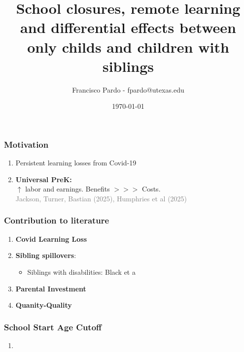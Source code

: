 \documentclass{beamer}
\title[]{School closures, remote learning and differential effects between only childs and children with siblings}
\author[Francisco Pardo] %
{Francisco Pardo - fpardo@utexas.edu \inst{1}}
\institute[UT] %
{
  \inst{1}%
  University of Texas at Austin
}
\date{\today}
\begin{document}
\frame{\titlepage}


\begin{frame}
    \label{update_scott}
    \frametitle{Motivation}
    \begin{enumerate}
        \item Persistent learning losses from Covid-19
        \item \textbf{Universal PreK:} \\
        $\uparrow$ labor and earnings. Benefits $>>>$ Costs. \\
        \small \textcolor{grey}{Jackson, Turner, Bastian (2025), Humphries et al (2025)}
    \end{enumerate}
\end{frame}

\begin{frame}
    \label{update_scott}
    \frametitle{Contribution to literature}
    \begin{enumerate}
        \item \textbf{Covid Learning Loss} \\
        \item \textbf{Sibling spillovers}: 
        \begin{itemize}
            \item Siblings with disabilities: Black et a
        \end{itemize}
        \item \textbf{Parental Investment} \\
        \item \textbf{Quanity-Quality} \\

    \end{enumerate}
\end{frame}

\begin{frame}
    \label{update_scott}
    \frametitle{School Start Age Cutoff}
    \begin{enumerate}
        \item 
    \end{enumerate}
\end{frame}
\end{document}
